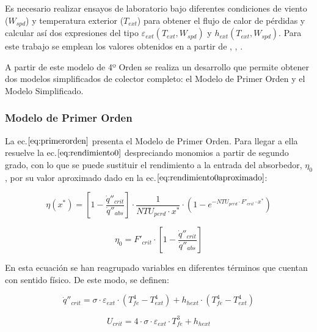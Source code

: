 \documentclass[11pt]{article}
\begin{document}
Es necesario realizar ensayos de laboratorio bajo diferentes condiciones
de viento (\(W_{spd}\)) y temperatura exterior (\(T_{ext}\)) para
obtener el flujo de calor de pérdidas y calcular así dos expresiones del
tipo \(\varepsilon_{ext}(T_{ext},W_{spd})\) y
\(h_{ext}(T_{ext},W_{spd})\). Para este trabajo se emplean los valores
obtenidos en \cite{1022085/7TD8VTGL} a partir de
\cite{1022085/2CSZR6MB}, \cite{1022085/Z2N8UMZB},
\cite{1022085/8AF3BT7W} .

A partir de este modelo de 4º Orden se realiza un desarrollo que permite
obtener dos modelos simplificados de colector completo: el Modelo de
Primer Orden y el Modelo Simplificado.

\hypertarget{modelo-de-primer-orden}{%
\subsubsection{Modelo de Primer Orden}\label{modelo-de-primer-orden}}

La ec.\(\eqref{eq:primerorden}\) presenta el Modelo de Primer Orden.
Para llegar a ella resuelve la ec.\(\eqref{eq:rendimiento0}\)
despreciando monomios a partir de segundo grado, con lo que se puede
sustituir el rendimiento a la entrada del absorbedor, \(\eta_{0}\), por
su valor aproximado dado en la ec.\(\eqref{eq:rendimiento0aproximado}\):

\begin{equation}
    \eta(x^{*}) = \left[1-\frac{\dot q''_{crit}}{\dot q''_{abs}}\right] \cdot \frac{1}{NTU_{perd} \cdot x^{*}} \cdot \left(1-e^{-NTU_{perd}\cdot F'_{crit}\cdot x^{*}}\right) 
    \label{eq:primerorden}
\end{equation}

\begin{equation}
    \eta_{0} = F'_{crit} \cdot \left[1-\frac{\dot q''_{crit}}{\dot q''_{abs}}\right] 
    \label{eq:rendimiento0aproximado}
\end{equation}

En esta ecuación se han reagrupado variables en diferentes términos que
cuentan con sentido físico. De este modo, se definen:

\begin{equation}
    \dot q''_{crit} = \sigma \cdot \varepsilon_{ext} \cdot \left(T^{4}_{fe}- T^{4}_{ext}\right)+h_{hext} \cdot \left(T^{4}_{fe}- T^{4}_{ext}\right)
    \label{eq:qcrit}
\end{equation}

\begin{equation}
    U_{crit} = 4 \cdot \sigma \cdot \varepsilon_{ext} \cdot T^{3}_{fe} + h_{hext}
    \label{eq:ucrit}
\end{equation}
\end{document}
